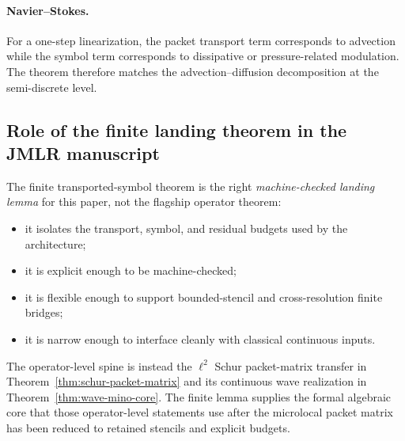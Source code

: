 \paragraph{Navier--Stokes.}
For a one-step linearization, the packet transport term corresponds to advection while the symbol term corresponds to dissipative or pressure-related modulation. The theorem therefore matches the advection--diffusion decomposition at the semi-discrete level.

\subsection{Role of the finite landing theorem in the JMLR manuscript}

The finite transported-symbol theorem is the right \emph{machine-checked landing lemma} for this paper, not the flagship operator theorem:
\begin{itemize}
\item it isolates the transport, symbol, and residual budgets used by the architecture;
\item it is explicit enough to be machine-checked;
\item it is flexible enough to support bounded-stencil and cross-resolution finite bridges;
\item it is narrow enough to interface cleanly with classical continuous inputs.
\end{itemize}
The operator-level spine is instead the $\ell^2$ Schur packet-matrix transfer in Theorem~\ref{thm:schur-packet-matrix} and its continuous wave realization in Theorem~\ref{thm:wave-mino-core}.  The finite lemma supplies the formal algebraic core that those operator-level statements use after the microlocal packet matrix has been reduced to retained stencils and explicit budgets.
